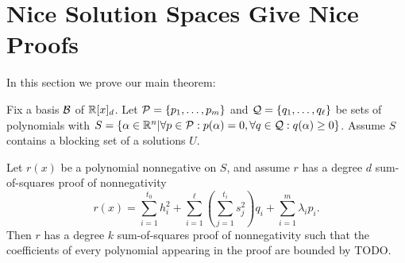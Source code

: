 \section{Nice Solution Spaces Give Nice Proofs}
\label{sec:main}

In this section we prove our main theorem:

\begin{theorem}\label{thm:main}
Fix a basis $\mathcal B$ of $\mathbb R[x]_d$. Let $\mathcal P = \{p_1,\dots,p_m\}$ and $\mathcal Q = \{q_1, \dots, q_\ell\}$ be sets of polynomials with $S = \{\alpha \in \mathbb R^n | \forall p \in \mathcal P: p(\alpha) = 0, \forall q \in \mathcal Q: q(\alpha) \geq 0\}$. Assume $S$ contains a blocking set of a solutions $U$.

Let $r(x)$ be a polynomial nonnegative on $S$, and assume $r$ has a degree $d$ sum-of-squares proof of nonnegativity 
\[r(x) = \sum_{i=1}^{t_0} h_i^2 + \sum_{i=1}^\ell \left(\sum_{j=1}^{t_i} s_j^2\right) q_i + \sum_{i=1}^m \lambda_i p_i.\] 
Then $r$ has a degree $k$ sum-of-squares proof of nonnegativity such that the coefficients of every polynomial appearing in the proof are bounded by TODO.
\end{theorem}
